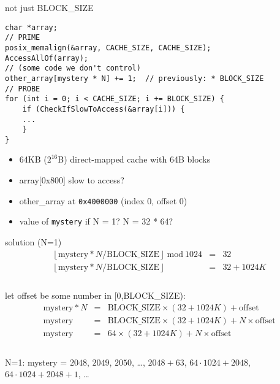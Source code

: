 \begin{frame}[fragile]{not just BLOCK\_SIZE}
\begin{Verbatim}[fontsize=\fontsize{9}{10}]
char *array;
// PRIME
posix_memalign(&array, CACHE_SIZE, CACHE_SIZE);
AccessAllOf(array);
// (some code we don't control)
other_array[mystery * N] += 1;  // previously: * BLOCK_SIZE
// PROBE
for (int i = 0; i < CACHE_SIZE; i += BLOCK_SIZE) {
    if (CheckIfSlowToAccess(&array[i])) {
    ...
    }
}
\end{Verbatim}
\begin{itemize}
\item 64KB ($2^{16}$B) direct-mapped cache with 64B blocks
\item array[0x800] slow to access?
\item other\_array at \texttt{0x4000000} (index 0, offset 0)
\item value of \texttt{mystery} if N = 1? N = 32 * 64?
\end{itemize}
\end{frame}

\begin{frame}{solution (N=1)}
\vspace{-1cm}
\begin{eqnarray*}
\left\lfloor\text{mystery} * N / \text{BLOCK\_SIZE}\right\rfloor~\text{mod}~1024 & = & 32 \\
\left\lfloor\text{mystery} * N / \text{BLOCK\_SIZE}\right\rfloor & = & 32 + 1024K \\
\end{eqnarray*}
\\
let offset be some number in [0,BLOCK\_SIZE): \\
\vspace{-1cm}
\begin{eqnarray*}
\text{mystery} * N & = & \text{BLOCK\_SIZE}\times(32+1024K) + \text{offset}\\
\text{mystery} & = & \text{BLOCK\_SIZE}\times(32+1024K) + N\times\text{offset} \\
\text{mystery} & = & 64\times(32+1024K)+N\times\text{offset} \\
\end{eqnarray*}
\\
N=1: mystery = $2048$, $2049$, $2050$, \ldots, $2048+63$, $64\cdot1024+2048$, $64\cdot1024+2048+1$, \ldots
\end{frame}

